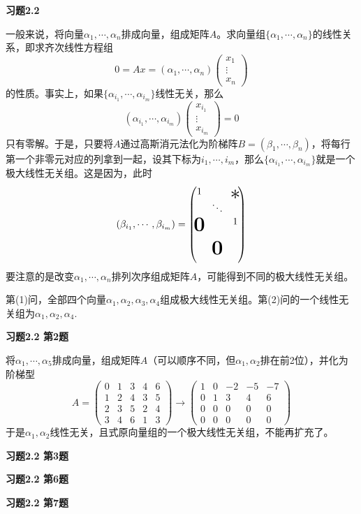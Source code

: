 \renewcommand{\newpageorvspace}{\vspace{2em}}

\date{第三次作业}



\maketitle

{\bf 习题2.2}

一般来说，将向量$\alpha_1,\cdots,\alpha_n$排成向量，组成矩阵$A$。求向量组$\{\alpha_1,\cdots,\alpha_n\}$的线性关系，即求齐次线性方程组
$$0 = Ax = (\alpha_1,\cdots,\alpha_n) \begin{pmatrix} x_{1} \\ \vdots \\ x_{n} \end{pmatrix}$$
的性质。事实上，如果$\{\alpha_{i_1},\cdots,\alpha_{i_m}\}$线性无关，那么
$$(\alpha_{i_1},\cdots,\alpha_{i_m}) \begin{pmatrix} x_{i_1} \\ \vdots \\ x_{i_m} \end{pmatrix} = 0$$
只有零解。于是，只要将$A$通过高斯消元法化为阶梯阵$B = (\beta_1,\cdots,\beta_n)$，将每行第一个非零元对应的列拿到一起，设其下标为$i_1,\cdots,i_m$，那么$\{\alpha_{i_1},\cdots,\alpha_{i_m}\}$就是一个极大线性无关组。这是因为，此时
$$(\beta_{i_1},\cdots,\beta_{i_m}) = \begin{pmatrix} 1 & & \makebox(0,0){\text{\huge $\ast$}} \\ & \ddots & \\ \makebox(0,0){\text{\huge\bf 0}} & & 1 \\ & & \\ & \makebox(0,0){\text{\huge\bf 0}} & \\ & & \end{pmatrix}$$
要注意的是改变$\alpha_1,\cdots,\alpha_n$排列次序组成矩阵$A$，可能得到不同的极大线性无关组。

第(1)问，全部四个向量$\alpha_1,\alpha_2,\alpha_3,\alpha_4$组成极大线性无关组。第(2)问的一个线性无关组为$\alpha_1,\alpha_2,\alpha_4$.

\newpageorvspace

{\bf 习题2.2 第2题}

将$\alpha_1,\cdots,\alpha_5$排成向量，组成矩阵$A$（可以顺序不同，但$\alpha_1,\alpha_2$排在前2位），并化为阶梯型
$$
A = \begin{pmatrix} 0 & 1 & 3 & 4 & 6 \\ 1 & 2 & 4 & 3 & 5 \\ 2 & 3 & 5 & 2 & 4 \\ 3 & 4 & 6 & 1 & 3 \end{pmatrix} \to
\begin{pmatrix} 1 & 0 & -2 & -5 & -7 \\ 0 & 1 & 3 & 4 & 6 \\ 0 & 0 & 0 & 0 & 0 \\ 0 & 0 & 0 & 0 & 0 \end{pmatrix}
$$
于是$\alpha_1,\alpha_2$线性无关，且式原向量组的一个极大线性无关组，不能再扩充了。

\newpageorvspace

{\bf 习题2.2 第3题}

\newpageorvspace

{\bf 习题2.2 第6题}

\newpageorvspace

{\bf 习题2.2 第7题}


